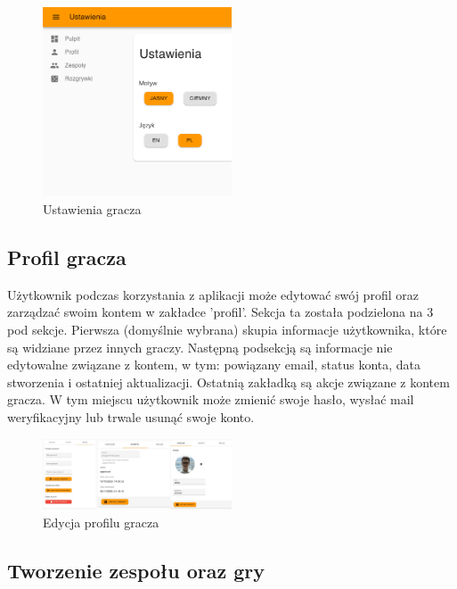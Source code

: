 \begin{figure}[h!]
  \centering
    \includegraphics[width=0.5\textwidth]{images/player/settings.png}
  \caption{Ustawienia gracza}
  \label{fig:mobile}
\end{figure}

\subsection{Profil gracza}

Użytkownik podczas korzystania z aplikacji może edytować swój profil oraz zarządzać swoim kontem w zakładce 'profil'. Sekcja ta została podzielona na 3 pod sekcje. Pierwsza (domyślnie wybrana) skupia informacje użytkownika, które są widziane przez innych graczy. Następną podsekcją są informacje nie edytowalne związane z kontem, w tym: powiązany email, status konta, data stworzenia i ostatniej aktualizacji. Ostatnią zakładką są akcje związane z kontem gracza. W tym miejscu użytkownik może zmienić swoje hasło, wysłać mail weryfikacyjny lub trwale usunąć swoje konto.

\begin{figure}[h!]
  \centering
    \includegraphics[width=0.5\textwidth]{images/player/userProfie.jpeg}
  \caption{Edycja profilu gracza}
  \label{fig:mobile}
\end{figure}

\subsection{Tworzenie zespołu oraz gry}

